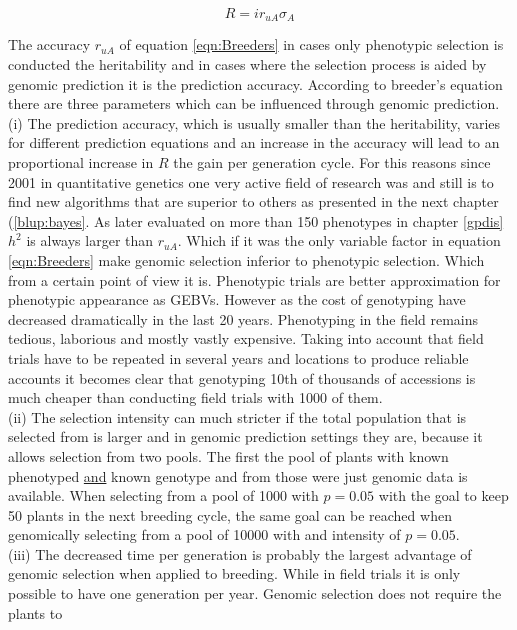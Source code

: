 \begin{equation}
 R = i r_{uA} \sigma_A
\label{eqn:Breeders}
\end{equation}

The accuracy $r_{uA}$ of equation \ref{eqn:Breeders} in cases only phenotypic selection is conducted the
heritability and in cases where the selection process is aided by genomic prediction it is the prediction
accuracy. According to breeder's equation there are three parameters which can be influenced through genomic
prediction. \\ (i) The prediction accuracy, which is usually smaller than the heritability, varies for
different prediction equations and an increase in the accuracy will lead to an proportional increase in $R$
the gain per generation cycle. For this reasons since 2001 in quantitative genetics one very active field of
research was and still is to find new algorithms that are superior to others as presented in the next chapter
(\ref{blup:bayes}. As later evaluated on more than 150 phenotypes in chapter \ref{gpdis} $h^2$ is always
larger than $r_{uA}$. Which if it was the only variable factor in equation \ref{eqn:Breeders} make genomic
selection inferior to phenotypic selection. Which from a certain point of view it is. Phenotypic trials are
better approximation for phenotypic appearance as GEBVs. However as the cost of genotyping have decreased
dramatically in the last 20 years. Phenotyping in the field remains tedious, laborious and mostly vastly
expensive. Taking into account that field trials have to be repeated in several years and locations to produce
reliable accounts it becomes clear that genotyping 10th of thousands of accessions is much cheaper than
conducting field trials with 1000 of them. \\ (ii) The selection intensity can much stricter if the
total population that is selected from is larger and in genomic prediction settings they are, because it
allows selection from two pools. The first the pool of plants with known phenotyped \underline{and} known
genotype and from those were just genomic data is available. When selecting from a pool of 1000 with $p=0.05$
with the goal to keep 50 plants in the next breeding cycle, the same goal can be reached when genomically
selecting from a pool of 10000 with and intensity of $p=0.05$. \\ (iii) The decreased time per
generation is probably the largest advantage of genomic selection when applied to breeding. While in field
trials it is only possible to have one generation per year. Genomic selection does not require the plants to

